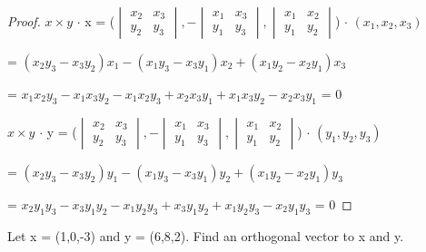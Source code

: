     \begin{proof}
        $x \times y$ $\cdot$ x =
        ($\begin{vmatrix}
            x_2 & x_3 \\
            y_2 & y_3 
        \end{vmatrix},
        - \begin{vmatrix}
            x_1 & x_3 \\
            y_1 & y_3 
        \end{vmatrix},
        \begin{vmatrix}
            x_1 & x_2 \\
            y_1 & y_2 
        \end{vmatrix}$)
        $\cdot$ $(x_1,x_2,x_3)$

        \hspace{1.6cm}
        = $(x_2y_3 - x_3y_2)x_1 - (x_1y_3 - x_3y_1)x_2 + (x_1y_2 - x_2y_1)x_3$

        \hspace{1.6cm}
        = $x_1x_2y_3 - x_1x_3y_2 - x_1x_2y_3 + x_2x_3y_1 + x_1x_3y_2 - x_2x_3y_1$
        = 0

        $x \times y$ $\cdot$ y =
        ($\begin{vmatrix}
            x_2 & x_3 \\
            y_2 & y_3 
        \end{vmatrix},
        - \begin{vmatrix}
            x_1 & x_3 \\
            y_1 & y_3 
        \end{vmatrix},
        \begin{vmatrix}
            x_1 & x_2 \\
            y_1 & y_2 
        \end{vmatrix}$)
        $\cdot$ $(y_1,y_2,y_3)$

        \hspace{1.6cm}
        = $(x_2y_3 - x_3y_2)y_1 - (x_1y_3 - x_3y_1)y_2 + (x_1y_2 - x_2y_1)y_3$

        \hspace{1.6cm}
        = $x_2y_1y_3 - x_3y_1y_2 - x_1y_2y_3 + x_3y_1y_2 + x_1y_2y_3 - x_2y_1y_3$
        = 0
    \end{proof}

    \vspace{0.5cm}



    \begin{example}
        Let x = (1,0,-3) and y = (6,8,2). Find an orthogonal vector to x and y.
    \end{example}

